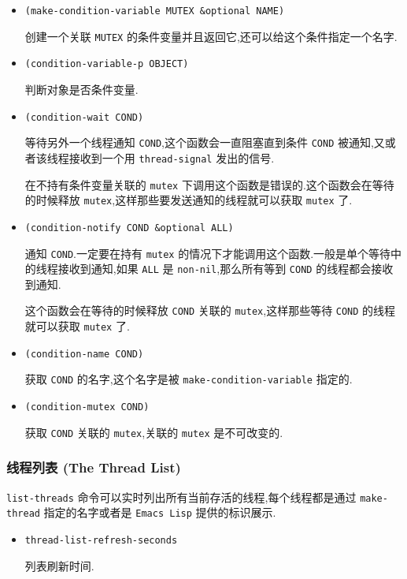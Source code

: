 \documentclass[11pt]{article}
\begin{document}
\begin{itemize}
\item \texttt{(make-condition-variable MUTEX \&optional NAME)}

创建一个关联 \texttt{MUTEX} 的条件变量并且返回它,还可以给这个条件指定一个名字.

\item \texttt{(condition-variable-p OBJECT)}

判断对象是否条件变量.

\item \texttt{(condition-wait COND)}

等待另外一个线程通知 \texttt{COND},这个函数会一直阻塞直到条件 \texttt{COND} 被通知,又或者该线程接收到一个用 \texttt{thread-signal} 发出的信号.

在不持有条件变量关联的 \texttt{mutex} 下调用这个函数是错误的.这个函数会在等待的时候释放 \texttt{mutex},这样那些要发送通知的线程就可以获取 \texttt{mutex} 了.

\item \texttt{(condition-notify COND \&optional ALL)}

通知 \texttt{COND}.一定要在持有 \texttt{mutex} 的情况下才能调用这个函数.一般是单个等待中的线程接收到通知,如果 \texttt{ALL} 是 \texttt{non-nil},那么所有等到 \texttt{COND} 的线程都会接收到通知.

这个函数会在等待的时候释放 \texttt{COND} 关联的 \texttt{mutex},这样那些等待 \texttt{COND} 的线程就可以获取 \texttt{mutex} 了.

\item \texttt{(condition-name COND)}

获取 \texttt{COND} 的名字,这个名字是被 \texttt{make-condition-variable} 指定的.

\item \texttt{(condition-mutex COND)}

获取 \texttt{COND} 关联的 \texttt{mutex},关联的 \texttt{mutex} 是不可改变的.
\end{itemize}


\subsubsection{线程列表 (The Thread List)}
\label{sec:org9349778}

\texttt{list-threads} 命令可以实时列出所有当前存活的线程,每个线程都是通过 \texttt{make-thread} 指定的名字或者是 \texttt{Emacs Lisp} 提供的标识展示.

\begin{itemize}
\item \texttt{thread-list-refresh-seconds}

列表刷新时间.
\end{itemize}
\end{document}
